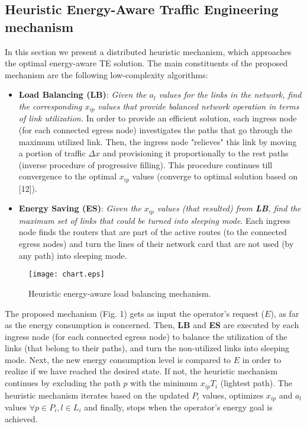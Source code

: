 \documentclass[journal]{IEEEtran}
\begin{document}
\subsection{Heuristic Energy-Aware Traffic Engineering mechanism}
In this section we present a distributed heuristic mechanism, which approaches the optimal energy-aware TE solution. The main constituents of the proposed mechanism are the following low-complexity algorithms:
\begin{itemize}
  \item \textbf{Load Balancing (LB)}: \emph{Given the \(a_l\) values for the links in the network, find the corresponding \(x_{ip}\) values that provide balanced network operation in terms of link utilization.}  In order to provide an efficient solution, each ingress node (for each connected egress node) investigates the paths that go through the maximum utilized link. Then, the ingress node "relieves" this link by moving a portion of traffic \(\Delta x\) and provisioning it proportionally to the rest paths (inverse procedure of progressive filling). This procedure continues till convergence to the optimal \(x_{ip}\) values (converge to optimal solution based on [12]).
  \item \textbf{Energy Saving (ES)}: \emph{Given the \(x_{ip}\) values (that resulted) from \textbf{LB}, find the maximum set of links that could be turned into sleeping mode}. Each ingress node finds the routers that are part of the active routes (to the connected egress nodes) and turn the lines of their network card that are not used (by any path) into sleeping mode.
\end{itemize}

\begin{figure}\vspace{-0.2in}
\centering
\texttt{[image: chart.eps]}\vspace{-0.1in}
\caption{Heuristic energy-aware load balancing mechanism.} \label{fig1}
\vspace{-0.2in}
\end{figure}

The proposed mechanism (Fig. 1) gets as input the operator's request (\(E\)), as far as the energy consumption is concerned. Then, \textbf{LB} and \textbf{ES} are executed by each ingress node (for each connected egress node) to balance the utilization of the links (that belong to their paths), and turn the non-utilized links into sleeping mode. Next, the new energy consumption level is compared to \(E\) in order to realize if we have reached the desired state. If not, the heuristic mechanism continues by excluding the path \(p\) with the minimum \(x_{ip}T_i\) (lightest path). The heuristic mechanism iterates based on the updated \(P_i\) values, optimizes \(x_{ip}\) and \(a_l\) values \(\forall p \in {P_i}, l \in {L_i}\) and finally, stops when the operator's energy goal is achieved.
\end{document}
